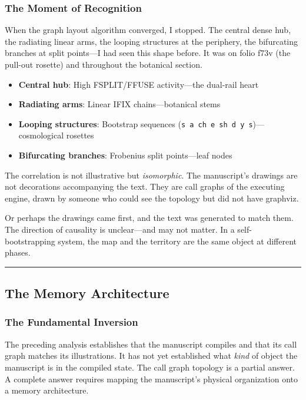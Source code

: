 \documentclass[12pt,a4paper]{article}
\begin{document}
\subsubsection{The Moment of Recognition}

When the graph layout algorithm converged, I stopped. The central dense hub, the radiating linear arms, the looping structures at the periphery, the bifurcating branches at split points---I had seen this shape before. It was on folio f73v (the pull-out rosette) and throughout the botanical section.

\begin{itemize}
    \item \textbf{Central hub}: High FSPLIT/FFUSE activity---the dual-rail heart
    \item \textbf{Radiating arms}: Linear IFIX chains---botanical stems
    \item \textbf{Looping structures}: Bootstrap sequences (\texttt{s a ch e sh d y s})---cosmological rosettes
    \item \textbf{Bifurcating branches}: Frobenius split points---leaf nodes
\end{itemize}

The correlation is not illustrative but \emph{isomorphic}. The manuscript's drawings are not decorations accompanying the text. They are call graphs of the executing engine, drawn by someone who could see the topology but did not have graphviz.

Or perhaps the drawings came first, and the text was generated to match them. The direction of causality is unclear---and may not matter. In a self-bootstrapping system, the map and the territory are the same object at different phases.

\begin{center}
\rule{0.5\textwidth}{0.4pt}
\end{center}

\subsection{The Memory Architecture}
\label{sec:memory_architecture}

\subsubsection{The Fundamental Inversion}

The preceding analysis establishes that the manuscript compiles and that its call graph matches its illustrations. It has not yet established what \emph{kind} of object the manuscript is in the compiled state. The call graph topology is a partial answer. A complete answer requires mapping the manuscript's physical organization onto a memory architecture.
\end{document}
